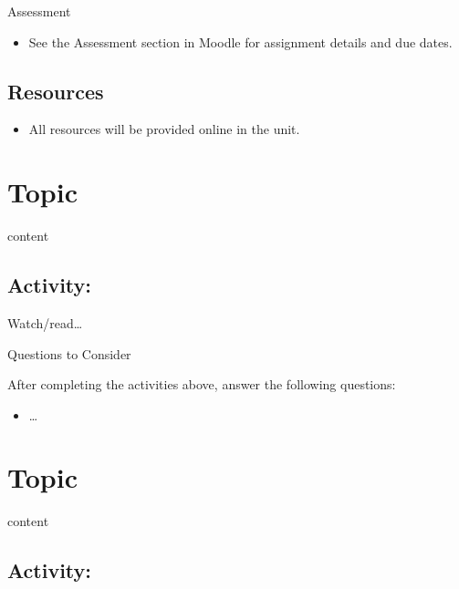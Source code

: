 \documentclass[
]{book}
\providecommand{\tightlist}{%
  \setlength{\itemsep}{0pt}\setlength{\parskip}{0pt}}
\theoremstyle{definition}
\theoremstyle{definition}
\theoremstyle{definition}
\theoremstyle{definition}
\theoremstyle{remark}
\begin{document}
\begin{assessment}
{Assessment}

\begin{itemize}
\tightlist
\item
  See the Assessment section in Moodle for assignment details and due dates.
\end{itemize}
\end{assessment}

\hypertarget{resources-1}{%
\subsection*{Resources}\label{resources-1}}

\begin{itemize}
\tightlist
\item
  All resources will be provided online in the unit.
\end{itemize}

\hypertarget{topic}{%
\section{Topic}\label{topic}}

content

\hypertarget{activity-2}{%
\subsection*{Activity:}\label{activity-2}}

\begin{reflect}
Watch/read\ldots{}

{Questions to Consider}

After completing the activities above, answer the following questions:

\begin{itemize}
\tightlist
\item
  \ldots{}
\end{itemize}
\end{reflect}

\hypertarget{topic-1}{%
\section{Topic}\label{topic-1}}

content

\hypertarget{activity-3}{%
\subsection*{Activity:}\label{activity-3}}
\end{document}
